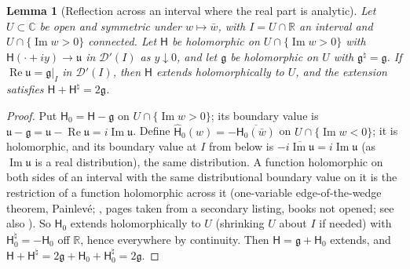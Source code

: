 \documentclass[11pt,a4paper]{article}
\numberwithin{equation}{section}
\newtheorem{lemma}[theorem]{Lemma}
\theoremstyle{definition}
\theoremstyle{remark}
\begin{document}
\begin{lemma}[Reflection across an interval where the real part is analytic]\label{lem:v17-refl}
Let $U\subset\mathbb C$ be open and symmetric under $w\mapsto\bar w$, with $I=U\cap\mathbb R$ an interval and $U\cap\{\operatorname{Im}w>0\}$ connected. Let $\mathsf H$ be holomorphic on $U\cap\{\operatorname{Im}w>0\}$ with $\mathsf H(\cdot+iy)\to\mathfrak u$ in $\mathcal D'(I)$ as $y\downarrow0$, and let $\mathfrak g$ be holomorphic on $U$ with $\mathfrak g^\natural=\mathfrak g$. If $\operatorname{Re}\mathfrak u=\mathfrak g|_I$ in $\mathcal D'(I)$, then $\mathsf H$ extends holomorphically to $U$, and the extension satisfies $\mathsf H+\mathsf H^\natural=2\mathfrak g$.
\end{lemma}
\begin{proof}
Put $\mathsf H_0=\mathsf H-\mathfrak g$ on $U\cap\{\operatorname{Im}w>0\}$; its boundary value is $\mathfrak u-\mathfrak g=\mathfrak u-\operatorname{Re}\mathfrak u=i\operatorname{Im}\mathfrak u$. Define $\widehat{\mathsf H}_0(w)=-\overline{\mathsf H_0(\bar w)}$ on $U\cap\{\operatorname{Im}w<0\}$; it is holomorphic, and its boundary value at $I$ from below is $-\overline{i\operatorname{Im}\mathfrak u}=i\operatorname{Im}\mathfrak u$ (as $\operatorname{Im}\mathfrak u$ is a real distribution), the same distribution. A function holomorphic on both sides of an interval with the same distributional boundary value on it is the restriction of a function holomorphic across it (one-variable edge-of-the-wedge theorem, Painlevé; \cite[pp.~63--66, 343--344]{Hormander1990}, pages taken from a secondary listing, books not opened; see also \cite{Rudin1971,BOT1958}). So $\mathsf H_0$ extends holomorphically to $U$ (shrinking $U$ about $I$ if needed) with $\mathsf H_0^\natural=-\mathsf H_0$ off $\mathbb R$, hence everywhere by continuity. Then $\mathsf H=\mathfrak g+\mathsf H_0$ extends, and $\mathsf H+\mathsf H^\natural=2\mathfrak g+\mathsf H_0+\mathsf H_0^\natural=2\mathfrak g$.
\end{proof}
\end{document}
